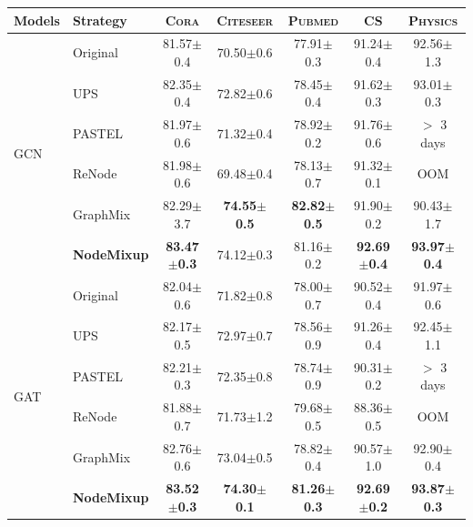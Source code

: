 \documentclass[letterpaper]{article} %
\begin{document}
\begin{table}[!htbp]
    \centering
    \begin{tabular}{l l c c c c c}
    \hline
    \toprule
    Models & Strategy & \textsc{Cora} & \textsc{Citeseer} & \textsc{Pubmed} & \textsc{CS} & \textsc{Physics}\\
    \midrule
    \multirow{6}{*}{GCN} & 
    	Original & 81.57\small{$\pm$0.4} & 70.50\small{$\pm$0.6} & 77.91\small{$\pm$0.3} & 91.24\small{$\pm$0.4} & 92.56\small{$\pm$1.3} \\
    ~ & UPS & 82.35\small{$\pm$0.4} & 72.82\small{$\pm$0.6} & 78.45\small{$\pm$0.4} & 91.62\small{$\pm$0.3} & 93.01\small{$\pm$0.3} \\
    ~ & PASTEL & 81.97\small{$\pm$0.6} & 71.32\small{$\pm$0.4} & 78.92\small{$\pm$0.2} & 91.76\small{$\pm$0.6} & $>$ 3 days \\
    ~ & ReNode & 81.98\small{$\pm$0.6} & 69.48\small{$\pm$0.4} & 78.13\small{$\pm$0.7} &	91.32\small{$\pm$0.1} & OOM \\
    ~ & GraphMix & 82.29\small{$\pm$3.7} & \textbf{74.55\small{$\pm$0.5}} & \textbf{82.82\small{$\pm$0.5}} & 91.90\small{$\pm$0.2} & 90.43\small{$\pm$1.7} \\
    ~ & \textbf{NodeMixup} & \textbf{83.47\small{$\pm$0.3}} & 74.12\small{$\pm$0.3} & 81.16\small{$\pm$0.2}  & \textbf{92.69\small{$\pm$0.4}} & \textbf{93.97\small{$\pm$0.4}}\\
    \midrule
    \multirow{6}{*}{GAT} & Original & 82.04\small{$\pm$0.6} & 71.82\small{$\pm$0.8} & 78.00\small{$\pm$0.7} & 90.52\small{$\pm$0.4} & 91.97\small{$\pm$0.6}\\
    ~ & UPS & 82.17\small{$\pm$0.5} & 72.97\small{$\pm$0.7} & 78.56\small{$\pm$0.9} & 91.26\small{$\pm$0.4} & 92.45\small{$\pm$1.1} \\
    ~ & PASTEL & 82.21\small{$\pm$0.3} & 72.35\small{$\pm$0.8} & 78.74\small{$\pm$0.9} & 90.31\small{$\pm$0.2} & $>$ 3 days\\
    ~ & ReNode & 81.88\small{$\pm$0.7} & 71.73\small{$\pm$1.2} & 79.68\small{$\pm$0.5} & 88.36\small{$\pm$0.5} & OOM \\
    ~ & GraphMix & 82.76\small{$\pm$0.6} & 73.04\small{$\pm$0.5} &  78.82\small{$\pm$0.4} & 90.57\small{$\pm$1.0} & 92.90\small{$\pm$0.4} \\
    ~ & \textbf{NodeMixup} & \textbf{83.52\small{$\pm$0.3}} & \textbf{74.30\small{$\pm$0.1}} &  \textbf{81.26\small{$\pm$0.3}} &  \textbf{92.69\small{$\pm$0.2}}  &  \textbf{93.87\small{$\pm$0.3}}\\
    \midrule

\end{tabular}
\end{table}
\end{document}
